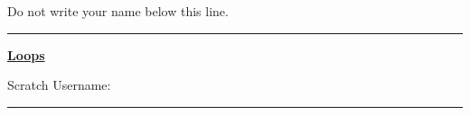\documentclass[letterpaper,12pt]{article}
\begin{document}
\noindent Do not write your name below this line. \\
\noindent \hrule
\begin{center}
{\Large \textbf{\underline{Loops}}} \\
\end{center}
Scratch Username: \rule{4cm}{0.4pt}

\noindent \dotfill
\end{document}
